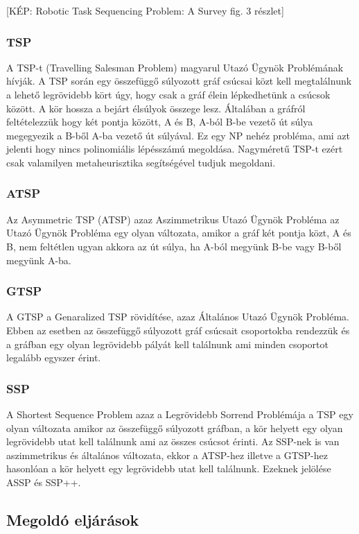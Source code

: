 [KÉP: Robotic Task Sequencing Problem: A Survey fig. 3 részlet]
 
\subsubsection{TSP}

A TSP-t (Travelling Salesman Problem) magyarul Utazó Ügynök Problémának hívják. A TSP során egy összefüggő súlyozott gráf csúcsai közt kell megtalálnunk a lehető legrövidebb kört úgy, hogy csak a gráf élein lépkedhetünk a csúcsok között. A kör hossza a bejárt élsúlyok összege lesz. Általában a gráfról feltételezzük hogy két pontja között, A és B, A-ból B-be vezető út súlya megegyezik a B-ből A-ba vezető út súlyával. Ez egy NP nehéz probléma, ami azt jelenti hogy nincs polinomiális lépésszámú megoldása. Nagyméretű TSP-t ezért csak valamilyen metaheurisztika segítségével tudjuk megoldani. 

\subsubsection{ATSP}
Az Asymmetric TSP (ATSP) azaz Aszimmetrikus Utazó Ügynök Probléma az Utazó Ügynök Probléma egy olyan változata, amikor a gráf két pontja közt, A és B, nem feltétlen ugyan akkora az út súlya, ha A-ból megyünk B-be vagy B-ből megyünk A-ba.

\subsubsection{GTSP}
A GTSP a Genaralized TSP rövidítése, azaz Általános Utazó Ügynök Probléma. Ebben az esetben az összefüggő súlyozott gráf csúcsait csoportokba rendezzük és a gráfban egy olyan legrövidebb pályát kell találnunk ami minden csoportot legalább egyszer érint. 
\subsubsection{SSP}
A Shortest Sequence Problem azaz a Legrövidebb Sorrend Problémája a TSP egy olyan változata amikor az összefüggő súlyozott gráfban, a kör helyett egy olyan legrövidebb utat kell találnunk ami az összes csúcsot érinti. Az SSP-nek is van aszimmetrikus és általános változata, ekkor a ATSP-hez illetve a GTSP-hez hasonlóan a kör helyett egy legrövidebb utat kell találnunk. Ezeknek jelölése ASSP és SSP++.

\cite{Alatartsev:2015}
\subsection{Megoldó eljárások}

